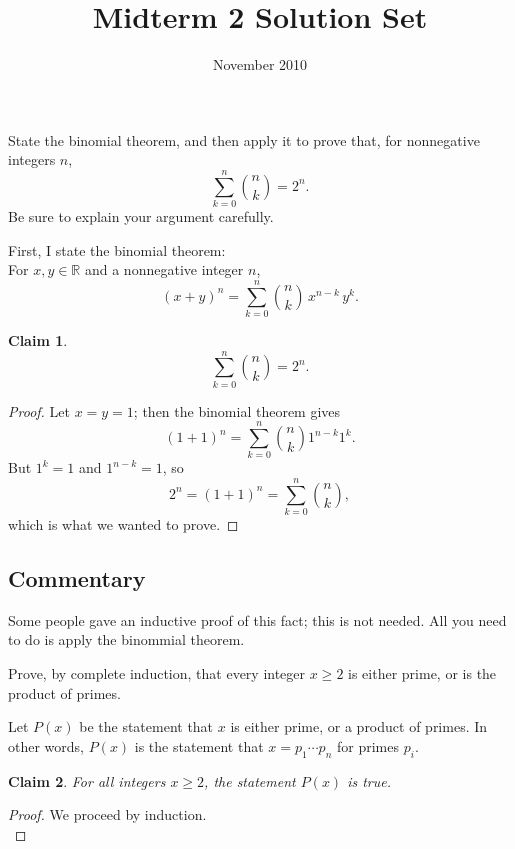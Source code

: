\documentclass[12pt]{midterm}
\title{Midterm 2 Solution Set}
\date{November 2010}
\newtheorem*{claim}{Claim}
\begin{document}
\begin{exam}

\begin{problem}[360]
  State the binomial theorem, and then apply it to prove that, for
  nonnegative integers $n$,
$$
\sum_{k=0}^n \binom{n}{k} = 2^n.
$$
Be sure to explain your argument carefully.
\end{problem}

\begin{solution}\begin{solutiontext}
First, I state the binomial theorem: \\
For $x, y \in \mathbb{R}$ and a nonnegative integer $n$,
$$(x+y)^n = \sum_{k=0}^n {n \choose k}\,x^{n-k} \,y^k.$$

\begin{claim}
$$
\sum_{k=0}^n \binom{n}{k} = 2^n.
$$
\end{claim}
\begin{proof}
Let $x = y = 1$; then the binomial theorem gives
$$(1+1)^n = \sum_{k=0}^n {n \choose k} 1^{n-k} 1^k.$$
But $1^{k} = 1$ and $1^{n-k} = 1$, so 
$$2^n = (1+1)^n = \sum_{k=0}^n {n \choose k},$$
which is what we wanted to prove.
\end{proof}

\color{magenta!50!black}
\vfill
\setlength{\leftskip}{0in}
\subsection*{Commentary}

Some people gave an inductive proof of this fact; this is not needed.  All you need to do is apply the binommial theorem.

\end{solutiontext}\end{solution}

\begin{problem}[360]
  Prove, by complete induction, that every integer $x \geq 2$ is
  either prime, or is the product of primes.
\end{problem}

\begin{solution}\begin{solutiontext}

    Let $P(x)$ be the statement that $x$ is either prime, or a product
    of primes.  In other words, $P(x)$ is the statement that $x = p_1
    \cdots p_n$ for primes $p_i$.
\begin{claim}
For all integers $x \geq 2$, the statement $P(x)$ is true.
\end{claim}
\begin{proof}
We proceed by induction. \\


\end{proof}
\end{solutiontext}
\end{solution}
\end{exam}
\end{document}
